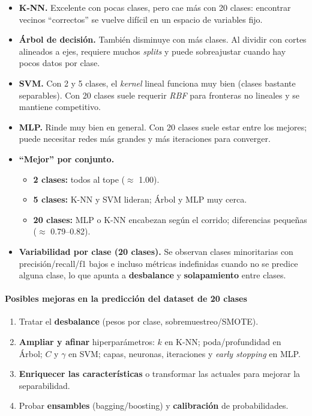 \documentclass[12pt,a4paper]{article}
\begin{document}
\begin{enumerate}
\begin{itemize}
    \item \textbf{K-NN.} Excelente con pocas clases, pero cae más con 20 clases: encontrar vecinos “correctos” se vuelve 
    difícil en un espacio de variables fijo.
    
    \item \textbf{Árbol de decisión.} También disminuye con más clases. Al dividir con cortes alineados a ejes, requiere 
    muchos \emph{splits} y puede sobreajustar cuando hay pocos datos por clase.
    
    \item \textbf{SVM.} Con 2 y 5 clases, el \emph{kernel} lineal funciona muy bien (clases bastante separables). Con 20 
    clases suele requerir \emph{RBF} para fronteras no lineales y se mantiene competitivo.
    
    \item \textbf{MLP.} Rinde muy bien en general. Con 20 clases suele estar entre los mejores; puede necesitar redes más 
    grandes y más iteraciones para converger.
    
    \item \textbf{“Mejor” por conjunto.} 
    \begin{itemize}
      \item \textbf{2 clases:} todos al tope ($\approx$ 1.00).
      \item \textbf{5 clases:} K-NN y SVM lideran; Árbol y MLP muy cerca.
      \item \textbf{20 clases:} MLP o K-NN encabezan según el corrido; diferencias pequeñas ($\approx$ 0.79--0.82).
    \end{itemize}
    
    \item \textbf{Variabilidad por clase (20 clases).} Se observan clases minoritarias con precisión/recall/f1 bajos e incluso 
    métricas indefinidas cuando no se predice alguna clase, lo que apunta a \textbf{desbalance} y \textbf{solapamiento} entre clases.
  \end{itemize}

  \paragraph{Posibles mejoras en la predicción del dataset de 20 clases}
  \begin{enumerate}
    \item Tratar el \textbf{desbalance} (pesos por clase, sobremuestreo/SMOTE).
    \item \textbf{Ampliar y afinar} hiperparámetros: $k$ en K-NN; poda/profundidad en Árbol; $C$ y $\gamma$ en SVM; capas, 
    neuronas, iteraciones y \emph{early stopping} en MLP.
    \item \textbf{Enriquecer las características} o transformar las actuales para mejorar la separabilidad.
    \item Probar \textbf{ensambles} (bagging/boosting) y \textbf{calibración} de probabilidades.
  \end{enumerate}


\end{enumerate}
\end{document}

